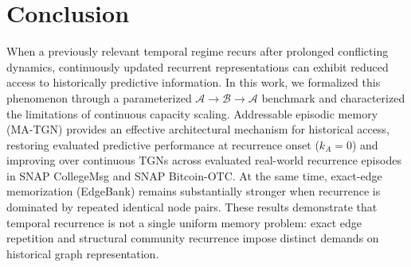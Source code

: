 \section{Conclusion}
\label{sec:conclusion}

When a previously relevant temporal regime recurs after prolonged conflicting dynamics, continuously updated recurrent representations can exhibit reduced access to historically predictive information. In this work, we formalized this phenomenon through a parameterized $\mathcal{A} \to \mathcal{B} \to \mathcal{A}$ benchmark and characterized the limitations of continuous capacity scaling. Addressable episodic memory (MA-TGN) provides an effective architectural mechanism for historical access, restoring evaluated predictive performance at recurrence onset ($k_A=0$) and improving over continuous TGNs across evaluated real-world recurrence episodes in SNAP CollegeMsg and SNAP Bitcoin-OTC. At the same time, exact-edge memorization (EdgeBank) remains substantially stronger when recurrence is dominated by repeated identical node pairs. These results demonstrate that temporal recurrence is not a single uniform memory problem: exact edge repetition and structural community recurrence impose distinct demands on historical graph representation.
